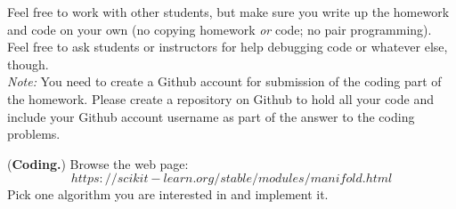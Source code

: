 \documentclass[12pt,letterpaper]{hmcpset}
\begin{document}
	Feel free to work with other students, but make sure you write up the homework
	and code on your own (no copying homework \textit{or} code; no pair programming).
	Feel free to ask students or instructors for help debugging code or whatever else,
	though.\\
	
	\textit{Note:} You need to create a Github account for submission of the coding part of the homework. Please create a repository on Github to hold all your code and include your Github account username as part of the answer to the coding problems.
	
	\begin{problem}[1]
		(\textbf{Coding.}) Browse the web page: $$https://scikit-learn.org/stable/modules/manifold.html$$
		Pick one algorithm you are interested in and implement it. 
	\end{problem}
	\begin{solution}
		\vfill
	\end{solution}
	\newpage
	
	
	
	
\end{document}
